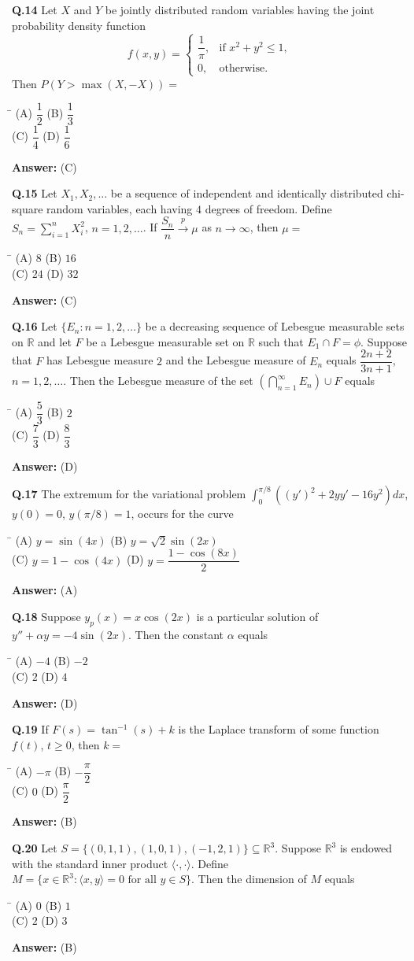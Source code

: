 \documentclass[11pt,a4paper]{article}
\newcommand{\optsfourA}[4]{%
  \begin{tabbing}
    \hspace{0.48\linewidth}\=\kill
    (A) #1 \> (B) #2 \\[2pt]
    (C) #3 \> (D) #4
  \end{tabbing}%
}
\newcommand{\ans}[1]{\textbf{Answer:} #1\par\medskip}
\begin{document}
\textbf{Q.14} Let $X$ and $Y$ be jointly distributed random variables having the joint probability density function
\[
  f(x, y) = \begin{cases} \dfrac{1}{\pi}, & \text{if } x^2 + y^2 \le 1, \\ 0, & \text{otherwise.} \end{cases}
\]
Then $P(Y > \max(X, -X)) =$
\optsfourA{$\dfrac{1}{2}$}{$\dfrac{1}{3}$}{$\dfrac{1}{4}$}{$\dfrac{1}{6}$}
\ans{(C)}

\textbf{Q.15} Let $X_1, X_2, \dots$ be a sequence of independent and identically distributed chi-square random variables, each having $4$ degrees of freedom. Define $S_n = \displaystyle\sum_{i=1}^{n} X_i^2$, $n = 1, 2, \dots$. If $\dfrac{S_n}{n} \xrightarrow{p} \mu$ as $n \to \infty$, then $\mu =$
\optsfourA{$8$}{$16$}{$24$}{$32$}
\ans{(C)}

\textbf{Q.16} Let $\{E_n : n = 1, 2, \dots\}$ be a decreasing sequence of Lebesgue measurable sets on $\mathbb{R}$ and let $F$ be a Lebesgue measurable set on $\mathbb{R}$ such that $E_1 \cap F = \phi$. Suppose that $F$ has Lebesgue measure $2$ and the Lebesgue measure of $E_n$ equals $\dfrac{2n + 2}{3n + 1}$, $n = 1, 2, \dots$. Then the Lebesgue measure of the set $\left(\displaystyle\bigcap_{n=1}^{\infty} E_n\right) \cup F$ equals
\optsfourA{$\dfrac{5}{3}$}{$2$}{$\dfrac{7}{3}$}{$\dfrac{8}{3}$}
\ans{(D)}

\textbf{Q.17} The extremum for the variational problem $\displaystyle\int_0^{\pi/8} \left((y')^2 + 2yy' - 16y^2\right)dx$, $y(0) = 0$, $y(\pi/8) = 1$, occurs for the curve
\optsfourA{$y = \sin(4x)$}{$y = \sqrt{2}\sin(2x)$}{$y = 1 - \cos(4x)$}{$y = \dfrac{1 - \cos(8x)}{2}$}
\ans{(A)}

\textbf{Q.18} Suppose $y_p(x) = x\cos(2x)$ is a particular solution of $y'' + \alpha y = -4\sin(2x)$. Then the constant $\alpha$ equals
\optsfourA{$-4$}{$-2$}{$2$}{$4$}
\ans{(D)}

\textbf{Q.19} If $F(s) = \tan^{-1}(s) + k$ is the Laplace transform of some function $f(t)$, $t \ge 0$, then $k =$
\optsfourA{$-\pi$}{$-\dfrac{\pi}{2}$}{$0$}{$\dfrac{\pi}{2}$}
\ans{(B)}

\textbf{Q.20} Let $S = \{(0, 1, 1), (1, 0, 1), (-1, 2, 1)\} \subseteq \mathbb{R}^3$. Suppose $\mathbb{R}^3$ is endowed with the standard inner product $\langle \cdot, \cdot \rangle$. Define $M = \{x \in \mathbb{R}^3 : \langle x, y \rangle = 0 \text{ for all } y \in S\}$. Then the dimension of $M$ equals
\optsfourA{$0$}{$1$}{$2$}{$3$}
\ans{(B)}
\end{document}
